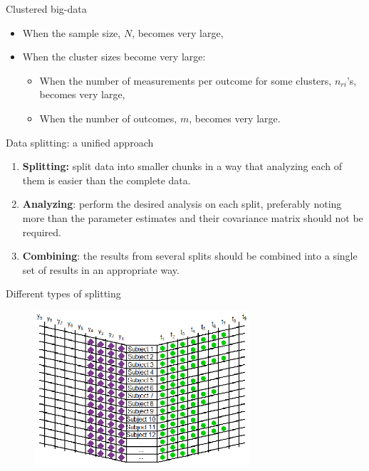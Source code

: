 \documentclass{beamer}
\begin{document}
\begin{frame}{Clustered big-data}
\begin{itemize}
\item When the sample size, $N$, becomes very large,
\item When the cluster sizes become very large:
\begin{itemize}
\item When the number of measurements per outcome for some clusters, $n_{ri}$'s, becomes very large,
\item When the number of outcomes, $m$, becomes very large.
\end{itemize}
\end{itemize}
\end{frame}

\begin{frame}{Data splitting: a unified approach}

\begin{enumerate}
\item \textbf{Splitting:} split data into smaller chunks in a way that analyzing each of them is easier than the complete data.

\item \textbf{Analyzing}: perform the desired analysis on each split, preferably noting more than the parameter estimates and their covariance matrix should not be required.

\item \textbf{Combining}: the results from several splits should be combined into a single set of results in an appropriate way.

\end{enumerate}

\end{frame}

\begin{frame}{Different types of splitting}

\begin{figure}
\centering
\includegraphics[width=8cm]{long.eps}
\end{figure} 
\end{frame}
\end{document}
